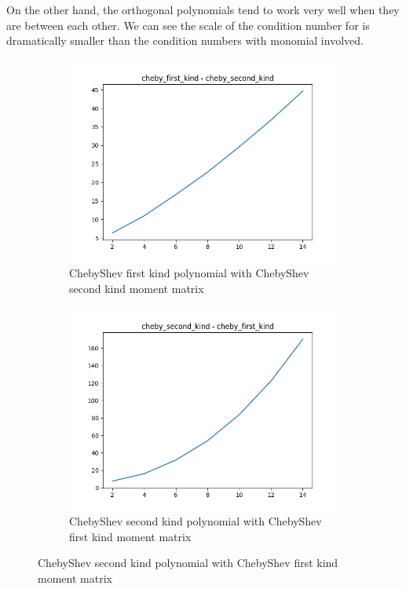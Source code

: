 \documentclass[12pt]{amsart}
\numberwithin{equation}{section}
\theoremstyle{definition}
\numberwithin{thm}{section}
\begin{document}
On the other hand, the orthogonal polynomials tend to work very well when they are between each other.
We can see the scale of the condition number for is dramatically smaller than the condition numbers with monomial involved. 

 \begin{figure}[hbt!]
     \centering
     \begin{subfigure}[b]{0.475\textwidth}
         \centering
         \includegraphics[width=\textwidth]{imgs/cheby_first_kind_cheby_second_kind.png}
         \caption[ChebyShev First Kind polynomial with monomial moment matrix]%
         {\small ChebyShev first kind polynomial with ChebyShev second kind moment matrix}%

     \end{subfigure}
     \hfill
     \begin{subfigure}[b]{0.475\textwidth}  
         \centering 
         \includegraphics[width=\textwidth]{imgs/cheby_second_kind_cheby_first_kind.png}
         \caption[ChebyShev second kind polynomial with ChebyShev first kind moment matrix]%
         {\small ChebyShev second kind polynomial with ChebyShev first kind moment matrix}%
 

\end{subfigure}
\end{figure}
\end{document}
